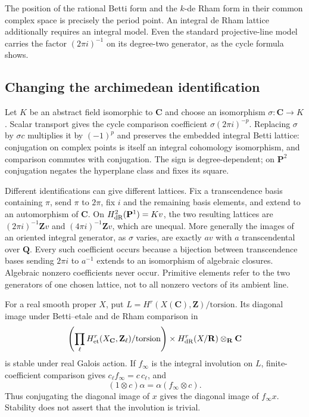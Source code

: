 \documentclass[11pt]{article}
\theoremstyle{definition}\newtheorem{definition}[theorem]{Definition}
\theoremstyle{remark}\newtheorem{remark}[theorem]{Remark}
\newcommand{\Q}{\mathbf Q}\newcommand{\Z}{\mathbf Z}
\newcommand{\R}{\mathbf R}\newcommand{\C}{\mathbf C}
\begin{document}
The position of the rational Betti form and the $k$-de Rham form in their common complex space is precisely the period point. An integral de Rham lattice additionally requires an integral model. Even the standard projective-line model carries the factor $(2\pi i)^{-1}$ on its degree-two generator, as the cycle formula shows.

\subsection{Changing the archimedean identification}
Let $K$ be an abstract field isomorphic to $\C$ and choose an isomorphism $\sigma:\C\to K$. Scalar transport gives the cycle comparison coefficient $\sigma(2\pi i)^{-p}$. Replacing $\sigma$ by $\sigma c$ multiplies it by $(-1)^p$ and preserves the embedded integral Betti lattice: conjugation on complex points is itself an integral cohomology isomorphism, and comparison commutes with conjugation. The sign is degree-dependent; on $\mathbf P^2$ conjugation negates the hyperplane class and fixes its square.

Different identifications can give different lattices. Fix a transcendence basis containing $\pi$, send $\pi$ to $2\pi$, fix $i$ and the remaining basis elements, and extend to an automorphism of $\C$. On $H^2_{\mathrm{dR}}(\mathbf P^1)=Kv$, the two resulting lattices are $(2\pi i)^{-1}\Z v$ and $(4\pi i)^{-1}\Z v$, which are unequal. More generally the images of an oriented integral generator, as $\sigma$ varies, are exactly $av$ with $a$ transcendental over $\Q$. Every such coefficient occurs because a bijection between transcendence bases sending $2\pi i$ to $a^{-1}$ extends to an isomorphism of algebraic closures. Algebraic nonzero coefficients never occur. Primitive elements refer to the two generators of one chosen lattice, not to all nonzero vectors of its ambient line.

For a real smooth proper $X$, put $L=H^r(X(\C),\Z)/\mathrm{torsion}$. Its diagonal image under Betti--etale and de Rham comparison in
\[
 \left(\prod_\ell H^r_{\mathrm{et}}(X_\C,\Z_\ell)/\mathrm{torsion}\right)
 \times H^r_{\dR}(X/\R)\otimes_\R\C
\]
is stable under real Galois action. If $f_\infty$ is the integral involution on $L$, finite-coefficient comparison gives $c_\ell f_\infty=c\,c_\ell$, and
\[
       (1\otimes c)\alpha=\alpha(f_\infty\otimes c).
\]
Thus conjugating the diagonal image of $x$ gives the diagonal image of $f_\infty x$. Stability does not assert that the involution is trivial.
\end{document}
